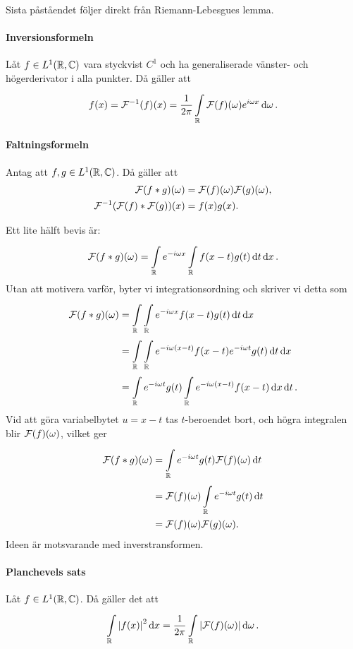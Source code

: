 Sista påståendet följer direkt från Riemann-Lebesgues lemma.

\paragraph{Inversionsformeln}
Låt $f\in L^{1}(\mathbb{R}, \mathbb{C})$ vara styckvist $C^{1}$ och ha generaliserade vänster- och högerderivator i alla punkter. Då gäller att
\begin{align*}
	f(x) = \mathcal{F}^{-1}(f)(x) = \frac{1}{2\pi}\int\limits_{\mathbb{R}}^{}\mathcal{F}(f)(\omega)e^{i\omega x}\dd{\omega}.
\end{align*}

\proof

\paragraph{Faltningsformeln}
Antag att $f, g\in L^{1}(\mathbb{R}, \mathbb{C})$. Då gäller att
\begin{align*}
	\mathcal{F}(f * g)(\omega)           &= \mathcal{F}(f)(\omega)\mathcal{F}(g)(\omega), \\
	\mathcal{F}^{-1}(\mathcal{F}(f) * \mathcal{F}(g))(x) &= f(x)g(x).
\end{align*}

\proof
Ett lite hälft bevis är:
\begin{align*}
	\mathcal{F}(f * g)(\omega) = \int\limits_{\mathbb{R}}^{}e^{-i\omega x}\int\limits_{\mathbb{R}}^{}f(x - t)g(t)\dd{t}\dd{x}.
\end{align*}
Utan att motivera varför, byter vi integrationsordning och skriver vi detta som
\begin{align*}
	\mathcal{F}(f * g)(\omega) &= \int\limits_{\mathbb{R}}^{}\int\limits_{\mathbb{R}}^{}e^{-i\omega x}f(x - t)g(t)\dd{t}\dd{x} \\
	                          &= \int\limits_{\mathbb{R}}^{}\int\limits_{\mathbb{R}}^{}e^{-i\omega(x - t)}f(x - t)e^{-i\omega t}g(t)\dd{t}\dd{x} \\
	                          &= \int\limits_{\mathbb{R}}^{}e^{-i\omega t}g(t)\int\limits_{\mathbb{R}}^{}e^{-i\omega(x - t)}f(x - t)\dd{x}\dd{t}.
\end{align*}
Vid att göra variabelbytet $u = x - t$ tas $t$-beroendet bort, och högra integralen blir $\mathcal{F}(f)(\omega)$, vilket ger
\begin{align*}
	\mathcal{F}(f * g)(\omega) &= \int\limits_{\mathbb{R}}^{}e^{-i\omega t}g(t)\mathcal{F}(f)(\omega)\dd{t} \\
	                          &= \mathcal{F}(f)(\omega)\int\limits_{\mathbb{R}}^{}e^{-i\omega t}g(t)\dd{t} \\
	                          &= \mathcal{F}(f)(\omega)\mathcal{F}(g)(\omega).
\end{align*}
Ideen är motsvarande med inverstransformen.

\paragraph{Planchevels sats}
Låt $f\in L^{1}(\mathbb{R}, \mathbb{C})$. Då gäller det att
\begin{align*}
	\int\limits_{\mathbb{R}}^{}\abs{f(x)}^{2}\dd{x} = \frac{1}{2\pi}\int\limits_{\mathbb{R}}^{}\abs{\mathcal{F}(f)(\omega)}\dd{\omega}.
\end{align*}